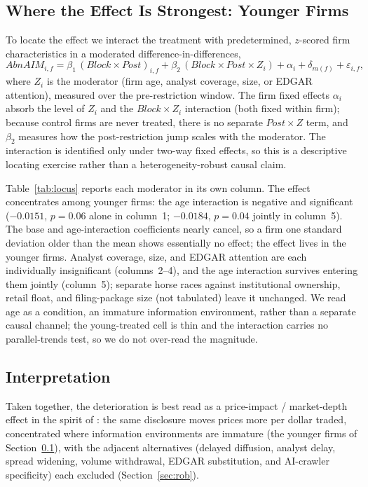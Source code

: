 \documentclass[12pt]{article}
\begin{document}


\subsection{Where the Effect Is Strongest: Younger Firms}\label{sec:mech_locus}
To locate the effect we interact the treatment with predetermined, $z$-scored firm characteristics in a moderated difference-in-differences,
\begin{equation}
\mathit{AbnAIM}_{i,f} = \beta_1\,(\mathit{Block}\times\mathit{Post})_{i,f} + \beta_2\,(\mathit{Block}\times\mathit{Post}\times Z_i) + \alpha_i + \delta_{m(f)} + \varepsilon_{i,f},
\label{eq:locus}
\end{equation}
where $Z_i$ is the moderator (firm age, analyst coverage, size, or EDGAR attention), measured over the pre-restriction window. The firm fixed effects $\alpha_i$ absorb the level of $Z_i$ and the $\mathit{Block}\times Z_i$ interaction (both fixed within firm); because control firms are never treated, there is no separate $\mathit{Post}\times Z$ term, and $\beta_2$ measures how the post-restriction jump scales with the moderator. The interaction is identified only under two-way fixed effects, so this is a descriptive locating exercise rather than a heterogeneity-robust causal claim.

Table~\ref{tab:locus} reports each moderator in its own column. The effect concentrates among younger firms: the age interaction is negative and significant ($-0.0151$, $p=0.06$ alone in column~1; $-0.0184$, $p=0.04$ jointly in column~5). The base and age-interaction coefficients nearly cancel, so a firm one standard deviation older than the mean shows essentially no effect; the effect lives in the younger firms. Analyst coverage, size, and EDGAR attention are each individually insignificant (columns~2--4), and the age interaction survives entering them jointly (column~5); separate horse races against institutional ownership, retail float, and filing-package size (not tabulated) leave it unchanged. We read age as a condition, an immature information environment, rather than a separate causal channel; the young-treated cell is thin and the interaction carries no parallel-trends test, so we do not over-read the magnitude.



\subsection{Interpretation}\label{sec:mech_interp}
Taken together, the deterioration is best read as a price-impact / market-depth effect in the spirit of \citet{Kyle1985}: the same disclosure moves prices more per dollar traded, concentrated where information environments are immature (the younger firms of Section~\ref{sec:mech_locus}), with the adjacent alternatives (delayed diffusion, analyst delay, spread widening, volume withdrawal, EDGAR substitution, and AI-crawler specificity) each excluded (Section~\ref{sec:rob}).
\end{document}
